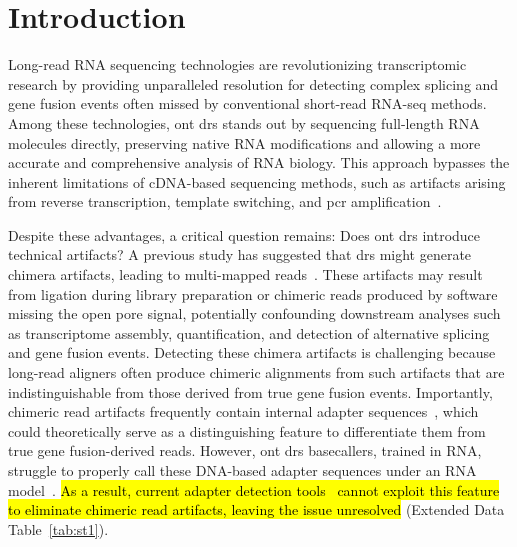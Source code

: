 \documentclass[pdflatex,sn-nature, lineno]{sn-jnl}%
\newcommand{\edtableref}[2]{Extended Data Table~\hyperref[#1]{\ref*{#1}#2}}
\begin{document}
\section{Introduction}


Long-read RNA sequencing technologies are revolutionizing transcriptomic research by providing unparalleled resolution for detecting complex splicing and gene fusion events often missed by conventional short-read RNA-seq methods.
Among these technologies, \gls{ont} \gls{drs} stands out by sequencing full-length RNA molecules directly, preserving native RNA modifications and allowing a more accurate and comprehensive analysis of RNA biology.
This approach bypasses the inherent limitations of cDNA-based sequencing methods, such as artifacts arising from reverse transcription, template switching, and \gls{pcr} amplification~\cite{garalde2018highly, jain2022advances}.

Despite these advantages, a critical question remains: Does \gls{ont} \gls{drs} introduce technical artifacts?
A previous study has suggested that \gls{drs} might generate chimera artifacts, leading to multi-mapped reads~\cite{smith2020molecular}.
These artifacts may result from ligation during library preparation or chimeric reads produced by software missing the open pore signal, potentially confounding downstream analyses such as transcriptome assembly, quantification, and detection of alternative splicing and gene fusion events.
Detecting these chimera artifacts is challenging because long-read aligners often produce chimeric alignments from such artifacts that are indistinguishable from those derived from true gene fusion events.
Importantly, chimeric read artifacts frequently contain internal adapter sequences~\cite{smith2020molecular}, which could theoretically serve as a distinguishing feature to differentiate them from true gene fusion-derived reads.
However, \gls{ont} \gls{drs} basecallers, trained in RNA, struggle to properly call these DNA-based adapter sequences under an RNA model~\cite{liu2024sequencing}.
\hl{As a result, current adapter detection tools\mbox{~\cite{pychopper, Wick2017, bonenfant2023porechop}} cannot exploit this feature to eliminate chimeric read artifacts, leaving the issue unresolved} (\edtableref{tab:st1}{}).
\end{document}
